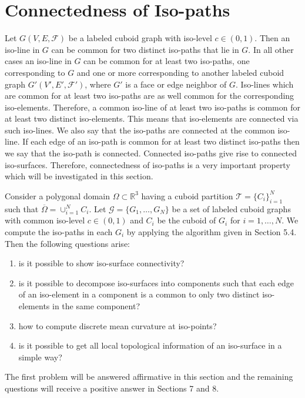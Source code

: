 \documentclass[a4paper,11pt]{article}
\begin{document}
\section{Connectedness of Iso-paths}
Let $G(V,E,\mathcal{F})$ be a labeled cuboid graph with iso-level $c\in (0,1)$. Then an iso-line in $G$
can be common for two distinct iso-paths that lie in $G$. In all other cases an iso-line in $G$
can be common for at least two iso-paths, one corresponding to $G$ and one or more corresponding to another
labeled cuboid graph $G'(V',E',\mathcal{F}')$, where $G'$ is a face or edge neighbor of $G$. Iso-lines which
are common for at least two iso-paths are as well common for the corresponding iso-elements. Therefore,
a common iso-line of at least two iso-paths is common for at least two distinct iso-elements. This means
that iso-elements are connected via such iso-lines. We also say that the iso-paths are connected at
the common iso-line. If each edge of an iso-path is common for at least two distinct iso-paths then
we say that the iso-path is connected. Connected iso-paths give rise to connected iso-surfaces. Therefore,
connectedness of iso-paths is a very important property which will be investigated in this section.

Consider a polygonal domain $\Omega\subset\mathbb{R}^3$ having a cuboid partition $\mathcal{T}=\{C_i\}_{i=1}^N$
such that $\overline{\Omega}=\cup_{i=1}^NC_i$. Let $\mathcal{G}=\{G_1,\ldots,G_N\}$ be a set of labeled cuboid
graphs with common iso-level $c\in (0,1)$ and $C_i$ be the cuboid of $G_i$ for $i=1,\ldots,N$. We compute the
iso-paths in each $G_i$ by applying the algorithm given in Section 5.4. Then the following questions arise:
\begin{enumerate}
\item is it possible to show iso-surface connectivity?
\item is it possible to decompose iso-surfaces into components such that each edge of an iso-element
in a component is a common to only two distinct iso-elements in the same component?
\item how to compute discrete mean curvature at iso-points?
\item is it possible to get all local topological information of an iso-surface in a simple way?
\end{enumerate}
The first problem will be answered affirmative in this section and the remaining questions will
receive a positive answer in Sections 7 and 8.\\
\end{document}
